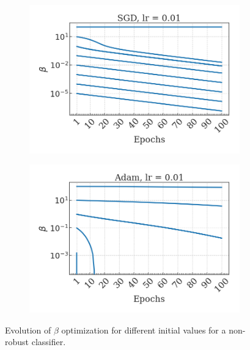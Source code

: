 \begin{figure}[H]
    \centering
    \begin{subfigure}[b]{0.45\textwidth}
        \centering
        \includegraphics[width=\textwidth]{img/results_discussion/empirical/nonrob_met=betas_hue=beta0_opt=sgd_lr=0.01.png}
    \end{subfigure}
    \hfill
    \begin{subfigure}[b]{0.45\textwidth}
        \centering
        \includegraphics[width=\textwidth]{img/results_discussion/empirical/nonrob_met=betas_hue=beta0_opt=adam_lr=0.01.png}
    \end{subfigure}
    \caption{Evolution of $\beta$ optimization for different initial values for a non-robust classifier.}
\end{figure}

